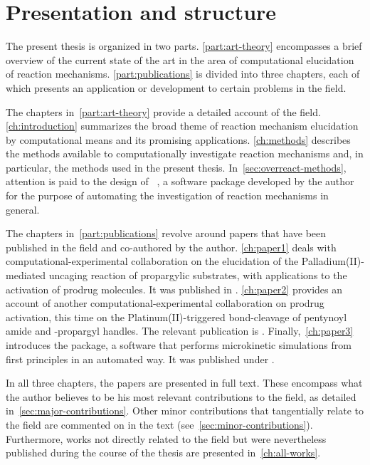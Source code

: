 \chapter{Presentation and structure}%
\label{ch:presentation}

The present thesis is organized in two parts.
\cref{part:art-theory}
encompasses a brief overview of the current state of the art in the area of
computational elucidation of reaction mechanisms.
\cref{part:publications} is divided into three chapters, each of which
presents an application or development to certain problems in the field.

The chapters in~\cref{part:art-theory} provide a detailed account of the
field.
\cref{ch:introduction} summarizes the broad theme of reaction mechanism
elucidation by computational means and its promising applications.
\cref{ch:methods} describes the methods available to computationally
investigate reaction mechanisms and, in particular, the methods used in the
present thesis.
In~\cref{sec:overreact-methods}, attention is paid to the design
of \overreact~\cite{Schneider2022,overreact2021zenodo}, a software package developed by the
author for the purpose of automating the investigation of reaction mechanisms
in general.

The chapters in~\cref{part:publications} revolve around papers that have
been published in the field and co-authored by the author.
\cref{ch:paper1} deals with
computational-experimental collaboration on the elucidation
of the Palladium(II)-mediated uncaging reaction of propargylic substrates,
with applications to the activation of prodrug molecules.\@
It was published in .
\cref{ch:paper2} provides an account of
another computational-experimental collaboration on prodrug activation,
this time on the Platinum(II)-triggered bond-cleavage
of pentynoyl amide and -propargyl handles.\@
The relevant publication is .
Finally,~\cref{ch:paper3} introduces the
\overreact package, a software that performs microkinetic simulations
from first principles in an automated way.\@
It was published under .

In all three chapters, the papers are presented in full text.
These encompass what the author believes to be his most relevant
contributions to the field, as detailed in~\cref{sec:major-contributions}.
Other minor contributions that tangentially relate to the field are commented
on in the text (see~\cref{sec:minor-contributions}).
Furthermore, works not directly related to the
field but were nevertheless published during the course of the thesis are
presented in~\cref{ch:all-works}.

